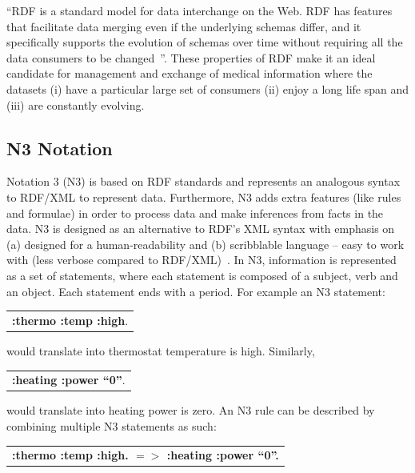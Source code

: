 \documentclass[conference]{IEEEtran}
\begin{document}
“RDF is a standard model for data interchange on the Web. RDF has features that facilitate data merging even if the underlying schemas differ, and it
specifically supports the evolution of schemas over time without requiring all the data consumers to be changed~\cite{rdfsite}”.  These properties of RDF make
it an ideal candidate for management and exchange of medical information where the datasets (i) have a particular large set of consumers (ii)
enjoy a long life span and (iii) are constantly evolving.

\subsection{N3 Notation}

Notation 3 (N3) is based on RDF standards and represents an analogous syntax to RDF/XML to represent data.  Furthermore, N3 adds extra features (like rules and
formulae) in
order to process data and make inferences from facts in the data.  N3 is designed as an alternative to RDF's XML syntax with emphasis on (a) designed for a
human-readability and (b) scribblable language – easy to work with (less verbose compared to RDF/XML)~\cite{notation3}.  In N3, information is represented as a
set of statements, where each statement is composed of a subject, verb and an object. Each statement ends with a period.
For example an N3 statement:

\begin{table}[!h]
\centering
 \begin{tabular}{c}
 \textbf{{:thermo :temp :high}}.\\ 
 \end{tabular}
\end{table}


would translate into thermostat temperature is high. Similarly,

\begin{table}[!h]
\centering
 \begin{tabular}{c}
 \textbf{{:heating :power “0”}}.\\ 
 \end{tabular}
\end{table}

would translate into heating power is zero.  An N3 rule can be described by combining multiple N3 statements as such:

\begin{table}[!h]
\centering
\begin{tabular}{c}
\textbf{{:thermo :temp :high}. $=>$ {:heating :power “0”}.}\\
\end{tabular}
\end{table}
\end{document}

